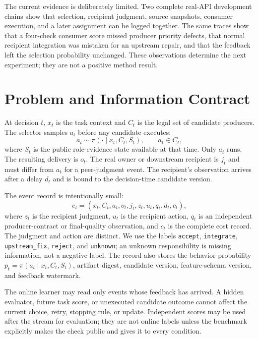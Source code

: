 \documentclass[sigconf,anonymous]{aamas}
\begin{document}
The current evidence is deliberately limited. Two complete real-API development chains
show that selection, recipient judgment, source snapshots, consumer execution, and a later
assignment can be logged together. The same traces show that a four-check consumer score
missed producer priority defects, that normal recipient integration was mistaken for an
upstream repair, and that the feedback left the selection probability unchanged. These
observations determine the next experiment; they are not a positive method result.

\section{Problem and Information Contract}

At decision $t$, $x_t$ is the task context and $C_t$ is the legal set of candidate
producers. The selector samples $a_t$ before any candidate executes:
\begin{equation}
 a_t \sim \pi(\cdot\mid x_t,C_t,S_t), \qquad a_t\in C_t,
 \label{eq:select}
\end{equation}
where $S_t$ is the public role-evidence state available at that time. Only $a_t$ runs.
The resulting delivery is $o_t$. The real owner or downstream recipient is $j_t$ and
must differ from $a_t$ for a peer-judgment event. The recipient's observation arrives
after a delay $d_t$ and is bound to the decision-time candidate version.

The event record is intentionally small:
\begin{equation}
 e_t=(x_t,C_t,a_t,o_t,j_t,z_t,u_t,q_t,d_t,c_t),
 \label{eq:event}
\end{equation}
where $z_t$ is the recipient judgment, $u_t$ is the recipient action, $q_t$ is an
independent producer-contract or final-quality observation, and $c_t$ is the complete
cost record. The judgment and action are distinct. We use the labels
\texttt{accept}, \texttt{integrate}, \texttt{upstream\_fix}, \texttt{reject}, and
\texttt{unknown}; an unknown responsibility is missing information, not a negative label.
The record also stores the behavior probability $p_t=\pi(a_t\mid x_t,C_t,S_t)$,
artifact digest, candidate version, feature-schema version, and feedback watermark.

The online learner may read only events whose feedback has arrived. A hidden evaluator,
future task score, or unexecuted candidate outcome cannot affect the current choice,
retry, stopping rule, or update. Independent scores may be used after the stream for
evaluation; they are not online labels unless the benchmark explicitly makes the check
public and gives it to every condition.
\end{document}
